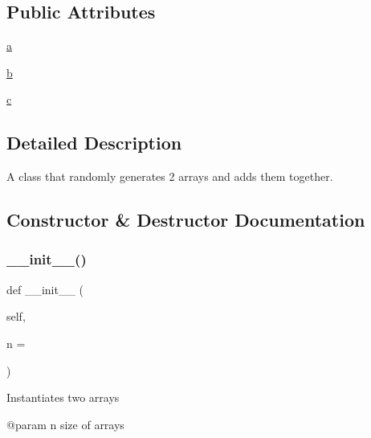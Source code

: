 \subsection*{Public Attributes}
\begin{DoxyCompactItemize}
\item 
\hyperlink{classsrc_1_1my__class_1_1MyClass_a4124bc0a9335c27f086f24ba207a4912}{a}
\item 
\hyperlink{classsrc_1_1my__class_1_1MyClass_a21ad0bd836b90d08f4cf640b4c298e7c}{b}
\item 
\hyperlink{classsrc_1_1my__class_1_1MyClass_ae0323a9039add2978bf5b49550572c7c}{c}
\end{DoxyCompactItemize}


\subsection{Detailed Description}
\begin{DoxyVerb}A class that randomly generates 2 arrays and adds them together.
\end{DoxyVerb}
 

\subsection{Constructor \& Destructor Documentation}
\mbox{\label{classsrc_1_1my__class_1_1MyClass_a01f7e43ceaf00de636b0e2fa32459c80}} 
\subsubsection{\texorpdfstring{\+\_\+\+\_\+init\+\_\+\+\_\+()}{\_\_init\_\_()}}
{\footnotesize\ttfamily def \+\_\+\+\_\+init\+\_\+\+\_\+ (\begin{DoxyParamCaption}\item[{}]{self,  }\item[{}]{n = {} }\end{DoxyParamCaption})}

\begin{DoxyVerb}Instantiates two arrays

@param n size of arrays
\end{DoxyVerb}
 

